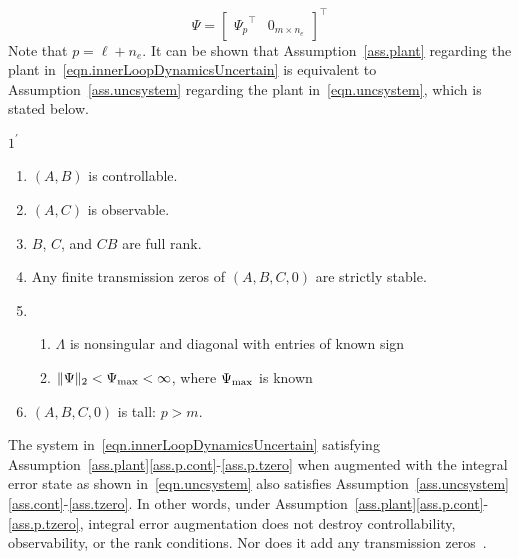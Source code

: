 \documentclass[journal]{IEEEtran}
\theoremstyle{innercustomthm}
\newenvironment{ass-dan}[1]
{\renewcommand\theinnercustomthm{#1}\innercustomthm\normalfont}
{\endinnercustomthm}
\begin{document}
  \begin{equation*}
    \Psi=
    [\begin{array}{cc} {\Psi_{p}}^{\top} & 0_{m\times n_{e}} \end{array}]^{\top}
  \end{equation*}
  Note that $p=\ell+n_{e}$.
  It can be shown that Assumption~\ref{ass.plant} regarding the plant in\ \eqref{eqn.innerLoopDynamicsUncertain} is equivalent to Assumption~\ref{ass.uncsystem} regarding the plant in\ \eqref{eqn.uncsystem}, which is stated below.

  \begin{ass-dan}{$1^{\prime}$} $\;$\label{ass.uncsystem}
    \begin{enumerate}[\Alph{enumi}), ref=\Alph{enumi}] %
      \itemsep0em
      \item{$(A,B)$ is controllable.\label{ass.cont}}
      \item{$(A,C)$ is observable.\label{ass.obsv}}
      \item{$B$, $C$, and $CB$ are full rank.\label{ass.rank}}
      \item{Any finite transmission zeros of $(A,B,C,0)$ are strictly stable.\label{ass.tzero}}
      \item{%
        \begin{enumerate}[(\alph{enumii}), ref=\alph{enumii}]
          \item{$\Lambda$ is nonsingular and diagonal with entries of known sign\label{ass.unc.lambda}}
          \item{$\|\Psi\|_{2}<\Psi_{\rm{\max}}<\infty$, where $\Psi_{\rm{\max}}$ is known\label{ass.unc.w}}
        \end{enumerate}\label{ass.unc}
      }
      \item{$(A,B,C,0)$ is tall: $p>m$.\label{ass.tall}}
    \end{enumerate}
  \end{ass-dan}

  \begin{rem-dan}
    The system in\ \eqref{eqn.innerLoopDynamicsUncertain} satisfying Assumption~\ref{ass.plant}\ref{ass.p.cont}-\ref{ass.p.tzero} when augmented with the integral error state as shown in\ \eqref{eqn.uncsystem} also satisfies Assumption~\ref{ass.uncsystem}\ref{ass.cont}-\ref{ass.tzero}.
    In other words, under Assumption~\ref{ass.plant}\ref{ass.p.cont}-\ref{ass.p.tzero}, integral error augmentation does not destroy controllability, observability, or the rank conditions.
    Nor does it add any transmission zeros\ \cite{lavretsky.output.2010}.
  \end{rem-dan}
\end{document}
